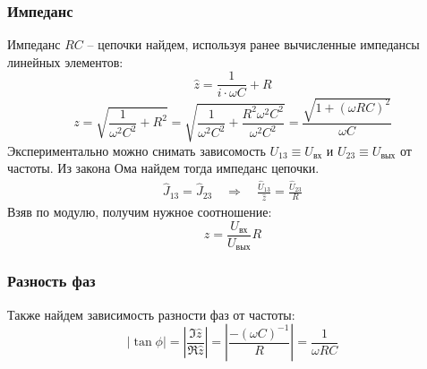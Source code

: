 \subsubsection{Импеданс}

Импеданс $RC$ -- цепочки найдем, используя ранее вычисленные
импедансы линейных элементов:
\begin{equation}
	\hat{z}=\frac{1}{i\cdot\omega C}+R
\end{equation}
\begin{equation}
	z=\sqrt{
		\frac{1}{\omega^2 C^2}
		+R^2
	}=
	\sqrt{
		\frac{1}{\omega^2 C^2}
		+\frac{R^2\omega^2 C^2}{\omega^2 C^2}
	}=\frac{\sqrt{1+(\omega RC)^2}}{\omega C}
\end{equation}
Экспериментально можно снимать зависомость $U_{13}\equiv U_\text{вх}$ и $U_{23}\equiv U_\text{вых}$ от частоты. Из закона Ома найдем тогда импеданс цепочки.
\begin{gather}
	\hat{J}_{13}=\hat{J}_{23} \quad\Rightarrow\quad
	\frac{\hat{U}_{13}}{\hat{z}}=\frac{\hat{U}_{23}}{R}
\end{gather}
Взяв по модулю, получим нужное соотношение:
\begin{equation}
	z=\frac{U_\text{вх}}{U_\text{вых}}R
\end{equation}

\subsubsection{Разность фаз}
Также найдем зависимость разности фаз от частоты:
\begin{equation}
	|\tan\phi| = |\frac{\Im\hat{z}}{\Re\hat{z}}|=
	|\frac{
		-(\omega C)^{-1}
	}{
		R
	}|=
	\frac{
		1
	}{
		\omega RC
	}
\end{equation}

